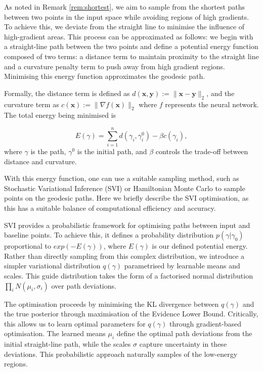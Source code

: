 As noted in Remark \ref{rem:shortest}, we aim to sample from the shortest paths between two points in the input space while avoiding regions of high gradients. To achieve this, we deviate from the straight line to minimise the influence of high-gradient areas. This process can be approximated as follows: we begin with a straight-line path between the two points and define a potential energy function composed of two terms: a distance term to maintain proximity to the straight line and a curvature penalty term to push away from high gradient regions. Minimising this energy function approximates the geodesic path.

Formally, the distance term is defined as $d(\textbf{x},\textbf{y}) := \|\textbf{x}-\textbf{y}\|_2$, and the curvature term as $c(\textbf{x}):=\|\nabla f(\textbf{x})\|_2$ where $f$ represents the neural network. The total energy being minimised is

\begin{equation}
	E(\gamma) = \sum_{i=1}^{n} d(\gamma_i, \gamma^0_i) - \beta c(\gamma_i), 
	\label{eq:energy}
\end{equation}
where $\gamma$ is the path, $\gamma^0$ is the initial path, and $\beta$ controls the trade-off between distance and curvature. 

With this energy function, one can use a suitable sampling method, such as Stochastic Variational Inference (SVI) or Hamiltonian Monte Carlo to sample points on the geodesic paths. Here we briefly describe the SVI optimisation, as this has a suitable balance of computational efficiency and accuracy.

SVI provides a probabilistic framework for optimising paths between input and baseline points. To achieve this, it defines a probability distribution $p(\gamma|\gamma_0)$ proportional to $exp(-E(\gamma))$, where $E(\gamma)$ is our defined potential energy. Rather than directly sampling from this complex distribution, we introduce a simpler variational distribution $q(\gamma)$ parametrised by learnable means and scales. This guide distribution takes the form of a factorised normal distribution $\prod_i N(\mu_i,\sigma_i)$ over path deviations.

The optimisation proceeds by minimising the KL divergence between $q(\gamma)$ and the true posterior through maximisation of the Evidence Lower Bound. Critically, this allows us to learn optimal parameters for $q(\gamma)$ through gradient-based optimisation. The learned means $\mu_i$ define the optimal path deviations from the initial straight-line path, while the scales $\sigma$ capture uncertainty in these deviations. This probabilistic approach naturally samples of the low-energy regions.

